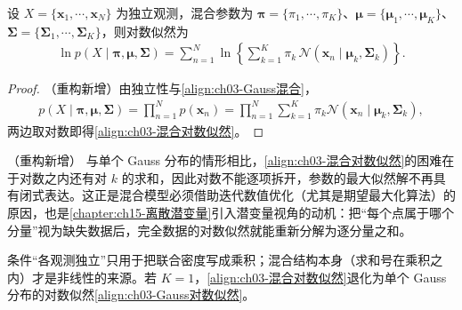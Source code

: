 \documentclass[../../main.tex]{subfiles}
\begin{document}
\begin{proposition}[混合密度的对数似然]\label{proposition:ch03-混合对数似然}
设 $X=\{\boldsymbol{x}_1,\cdots,\boldsymbol{x}_N\}$ 为独立观测，混合参数为 $\boldsymbol{\pi}=\{\pi_1,\cdots,\pi_K\}$、$\boldsymbol{\mu}=\{\boldsymbol{\mu}_1,\cdots,\boldsymbol{\mu}_K\}$、$\boldsymbol{\Sigma}=\{\boldsymbol{\Sigma}_1,\cdots,\boldsymbol{\Sigma}_K\}$，则对数似然为
\begin{align}
\ln p(X\mid\boldsymbol{\pi},\boldsymbol{\mu},\boldsymbol{\Sigma})=\sum_{n=1}^{N}\ln\left\{\sum_{k=1}^{K}\pi_{k}\,\mathcal{N}(\boldsymbol{x}_n\mid\boldsymbol{\mu}_{k},\boldsymbol{\Sigma}_{k})\right\}.
\label{align:ch03-混合对数似然}
\end{align}
\end{proposition}
\begin{proof}
（重构新增）由独立性与\eqref{align:ch03-Gauss混合}，
\begin{align*}
p(X\mid\boldsymbol{\pi},\boldsymbol{\mu},\boldsymbol{\Sigma})=\prod_{n=1}^{N}p(\boldsymbol{x}_n)=\prod_{n=1}^{N}\sum_{k=1}^{K}\pi_{k}\mathcal{N}(\boldsymbol{x}_n\mid\boldsymbol{\mu}_k,\boldsymbol{\Sigma}_k),
\end{align*}
两边取对数即得\eqref{align:ch03-混合对数似然}。
\end{proof}

\begin{remark}（重构新增）
与单个 Gauss 分布的情形相比，\eqref{align:ch03-混合对数似然}的困难在于对数之内还有对 $k$ 的求和，因此对数不能逐项拆开，参数的最大似然解不再具有闭式表达。这正是混合模型必须借助迭代数值优化（尤其是期望最大化算法）的原因，也是\cref{chapter:ch15-离散潜变量}引入潜变量视角的动机：把“每个点属于哪个分量”视为缺失数据后，完全数据的对数似然就能重新分解为逐分量之和。

条件“各观测独立”只用于把联合密度写成乘积；混合结构本身（求和号在乘积之内）才是非线性的来源。若 $K=1$，\eqref{align:ch03-混合对数似然}退化为单个 Gauss 分布的对数似然\eqref{align:ch03-Gauss对数似然}。
\end{remark}
\end{document}
